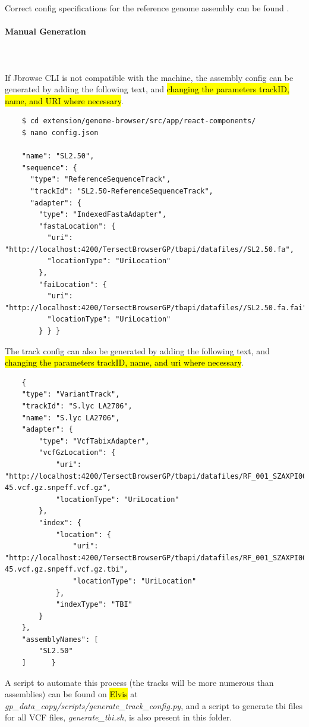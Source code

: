 \documentclass[12pt]{article}
\begin{document}
Correct config specifications for the reference genome assembly can be found . 

\paragraph{Manual Generation}\mbox{}
\\\\
If Jbrowse CLI is not compatible with the machine, the assembly config can be generated by adding the following text, and \hl{changing the parameters trackID, name, and URI where necessary}. 

\begin{lstlisting}
    $ cd extension/genome-browser/src/app/react-components/
    $ nano config.json

    "name": "SL2.50", 
    "sequence": { 
      "type": "ReferenceSequenceTrack", 
      "trackId": "SL2.50-ReferenceSequenceTrack", 
      "adapter": { 
        "type": "IndexedFastaAdapter", 
        "fastaLocation": { 
          "uri": "http://localhost:4200/TersectBrowserGP/tbapi/datafiles//SL2.50.fa", 
          "locationType": "UriLocation" 
        }, 
        "faiLocation": { 
          "uri": "http://localhost:4200/TersectBrowserGP/tbapi/datafiles//SL2.50.fa.fai", 
          "locationType": "UriLocation" 
        } } } 
\end{lstlisting}

The track config can also be generated by adding the following text, and \hl{changing the parameters trackID, name, and uri where necessary}. 

\begin{lstlisting}
    { 
    "type": "VariantTrack", 
    "trackId": "S.lyc LA2706", 
    "name": "S.lyc LA2706", 
    "adapter": { 
        "type": "VcfTabixAdapter", 
        "vcfGzLocation": { 
            "uri": "http://localhost:4200/TersectBrowserGP/tbapi/datafiles/RF_001_SZAXPI008746-45.vcf.gz.snpeff.vcf.gz", 
            "locationType": "UriLocation" 
        }, 
        "index": { 
            "location": { 
                "uri": "http://localhost:4200/TersectBrowserGP/tbapi/datafiles/RF_001_SZAXPI008746-45.vcf.gz.snpeff.vcf.gz.tbi", 
                "locationType": "UriLocation" 
            }, 
            "indexType": "TBI" 
        } 
    }, 
    "assemblyNames": [ 
        "SL2.50" 
    ]      } 
\end{lstlisting}

A script to automate this process (the tracks will be more numerous than assemblies) can be found on \hl{Elvis} at \textit{gp\_data\_copy/scripts/generate\_track\_config.py}, and  a script to generate tbi files for all VCF files, \textit{generate\_tbi.sh}, is also present in this folder. 
\end{document}
